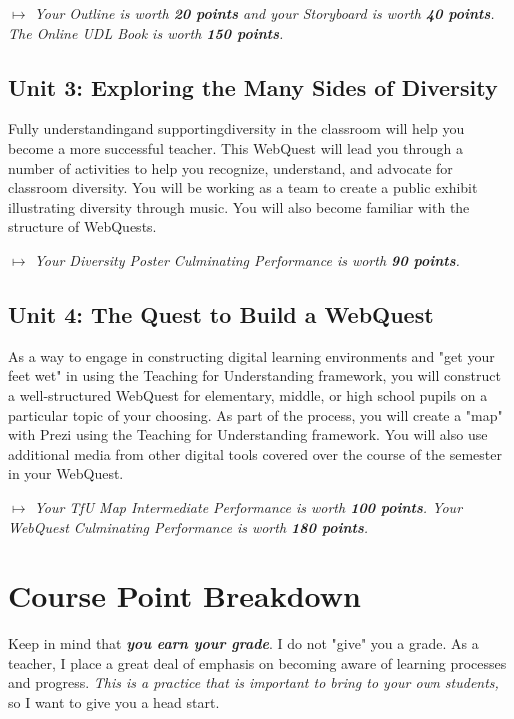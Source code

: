 \documentclass{tufte-handout}
\begin{document}
\medskip\noindent\textit{$\mapsto$ Your Outline is worth \textbf{20 points} and your Storyboard is worth \textbf{40 points}. The Online UDL Book is worth \textbf{150 points}.}

\subsection{Unit 3: Exploring the Many Sides of Diversity}

Fully understanding\textemdash{}and supporting\textemdash{}diversity in the classroom will help you become a more successful teacher. This WebQuest will lead you through a number of activities to help you recognize, understand, and advocate for classroom diversity. You will be working as a team to create a public exhibit illustrating diversity through music. You will also become familiar with the structure of WebQuests.

\medskip\noindent\textit{$\mapsto$ Your Diversity Poster Culminating Performance is worth \textbf{90 points}.}

\subsection{Unit 4: The Quest to Build a WebQuest}

As a way to engage in constructing digital learning environments and "get your feet wet" in using the Teaching for Understanding framework, you will construct a well-structured WebQuest for elementary, middle, or high school pupils on a particular topic of your choosing. As part of the process, you will create a "map" with Prezi using the Teaching for Understanding framework. You will also use additional media from other digital tools covered over the course of the semester in your WebQuest.

\medskip\noindent\textit{$\mapsto$ Your TfU Map Intermediate Performance is worth \textbf{100 points}. Your WebQuest Culminating Performance is worth \textbf{180 points}.}

\section{Course Point Breakdown}

Keep in mind that \emph{\textbf{you earn your grade}}. I do not "give" you a grade. As a teacher, I place a great deal of emphasis on becoming aware of learning processes and progress. \emph{This is a practice that is important to bring to your own students,} so I want to give you a head start.
\end{document}

